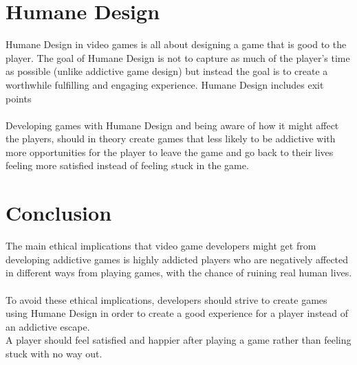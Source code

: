\documentclass{scrartcl}
\begin{document}
\section{Humane Design}
Humane Design in video games is all about designing a game that is good to the player. The goal of Humane Design is not to capture as much of the player's time as possible (unlike addictive game design) but instead the goal is to create a worthwhile fulfilling and engaging experience.
Humane Design includes exit points\cite{ExitPoints, Addiction4, HumaneDesign}
\\
\\
Developing games with Humane Design and being aware of how it might affect the players, should in theory create games that less likely to be addictive with more opportunities for the player to leave the game and go back to their lives feeling more satisfied instead of feeling stuck in the game.


\section{Conclusion}
The main ethical implications that video game developers might get from developing addictive games is highly addicted players who are negatively affected in different ways from playing games, with the chance of ruining real human lives.
\\
\\
To avoid these ethical implications, developers should strive to create games using Humane Design in order to create a good experience for a player instead of an addictive escape.
\\
A player should feel satisfied and happier after playing a game rather than feeling stuck with no way out.




\end{document}
